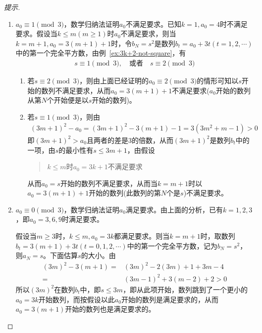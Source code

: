 \begin{proof}[提示]
\begin{enumerate}
  \item $a_0\equiv1\pmod3$，数学归纳法证明$a_0$不满足要求。已知$k=1,a_0=4$时不满足要求。假设当$k\le m(m\ge1)$时$a_0$不满足要求，则当$k=m+1, a_0=3(m +1)+1$时，令$b_N=s^2$是数列$b_t = a_0+3t(t=1,2,\cdots)$中的第一个完全平方数，由例~\ref{ex:3k+2-not-square}，有
    \begin{align*}
      s\equiv1\pmod3,\quad\text{或者}\quad s\equiv2\pmod3
    \end{align*}
    \begin{enumerate}
    \item 若$s\equiv2\pmod3$，则由上面已经证明的$a_0\equiv2\pmod3$的情形可知以$s$开始的数列不满足要求，从而$a_0=3(m+1)+1$不满足要求($a_0$开始的数列从第$N$个开始便是以$s$开始的数列)。
    \item 若$s\equiv1\pmod3$，则由
      \begin{align*}
        (3m+1)^2 - a_0 = (3m+1)^2 - 3(m+1) - 1 = 3(3m^2 + m - 1) > 0
      \end{align*}
      即$(3m+1)^2 > a_0$且两者的差是3的倍数，从而$(3m+1)^2$是数列$b_t$中的一项，由$s$的最小性有$s\le 3m+1$，由假设
      \begin{quotation}
        $k\le m$时$a_0=3k+1$不满足要求
      \end{quotation}
      从而$a_0=s$开始的数列不满足要求，从而当$k=m+1$时以$a_0=3(m+1)+1$开始的数列(此数列的第$N$个是$s$)不满足要求。
    \end{enumerate}
    
  \item $a_0\equiv0\pmod3$，数学归纳法证明$a_0$满足要求。由上面的分析，已有$k=1,2,3$，即$a_0=3,6,9$时满足要求。

    假设当$m\ge3$时，$k\le m, a_0=3k$都满足要求。则当$k=m+1$时，取数列$b_t = 3(m+1) + 3t(t=0,1,2,\cdots)$中的第一个完全平方数，记为$b_N = s^2$，则$a_N = s$。下面估算$s$的大小。由
    \begin{align*}
      (3m)^2 - 3(m+1) ={}& (3m)^2 - 2(3m) + 1 + 3m - 4\\
      ={}& (3m-1)^2 + 3(m - 2) + 2 > 0
    \end{align*}
    所以$(3m)^2$在数列$b_t$中，即$s\le 3m$，即从此项开始，数列跳到了一个更小的$a_0=3k$开始数列，而按假设以此$a_0$开始的数列是满足要求的，从而$a_0=3(m+1)$开始的数列也是满足要求的。\qedhere
  \end{enumerate}
\end{proof}

